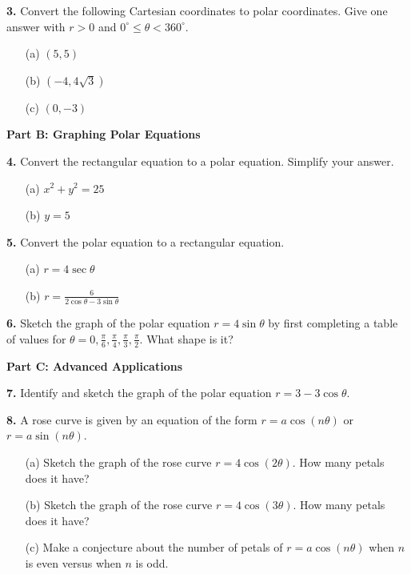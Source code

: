 \documentclass[12pt]{article}
\begin{document}
\textbf{3.} Convert the following Cartesian coordinates to polar coordinates. Give one answer with $r>0$ and $0^\circ \leq \theta < 360^\circ$.
\begin{enumerate}
    \item[(a)] $(5, 5)$
    \vspace{2cm}
    \item[(b)] $(-4, 4\sqrt{3})$
    \vspace{2cm}
    \item[(c)] $(0, -3)$
    \vspace{2cm}
\end{enumerate}

\textbf{Part B: Graphing Polar Equations}

\textbf{4.} Convert the rectangular equation to a polar equation. Simplify your answer.
\begin{enumerate}
    \item[(a)] $x^2 + y^2 = 25$
    \vspace{3cm}
    \item[(b)] $y = 5$
    \vspace{3cm}
\end{enumerate}

\textbf{5.} Convert the polar equation to a rectangular equation.
\begin{enumerate}
    \item[(a)] $r = 4\sec\theta$
    \vspace{3cm}
    \item[(b)] $r = \frac{6}{2\cos\theta - 3\sin\theta}$
    \vspace{3cm}
\end{enumerate}

\textbf{6.} Sketch the graph of the polar equation $r=4\sin\theta$ by first completing a table of values for $\theta = 0, \frac{\pi}{6}, \frac{\pi}{4}, \frac{\pi}{3}, \frac{\pi}{2}$. What shape is it?
\vspace{6cm}

\textbf{Part C: Advanced Applications}

\textbf{7.} Identify and sketch the graph of the polar equation $r = 3 - 3\cos\theta$.
\vspace{6cm}

\textbf{8.} A rose curve is given by an equation of the form $r = a \cos(n\theta)$ or $r=a\sin(n\theta)$.
\begin{enumerate}
    \item[(a)] Sketch the graph of the rose curve $r = 4\cos(2\theta)$. How many petals does it have?
    \vspace{5cm}
    \item[(b)] Sketch the graph of the rose curve $r = 4\cos(3\theta)$. How many petals does it have?
    \vspace{5cm}
    \item[(c)] Make a conjecture about the number of petals of $r = a\cos(n\theta)$ when $n$ is even versus when $n$ is odd.
    \vspace{2cm}
\end{enumerate}
\end{document}
